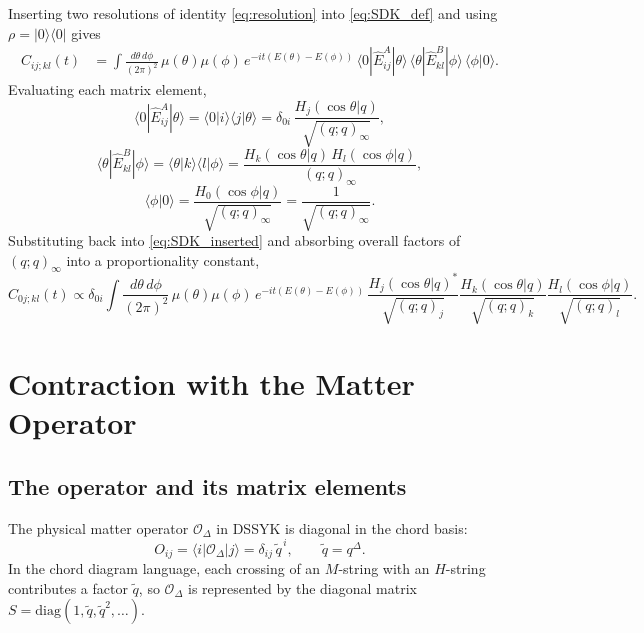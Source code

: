\documentclass[12pt]{article}
\begin{document}
Inserting two resolutions of identity \eqref{eq:resolution} into \eqref{eq:SDK_def}
and using $\rho = |0\rangle\langle 0|$ gives
\begin{align}
    C_{ij;kl}(t)
    &= \int\frac{d\theta\,d\phi}{(2\pi)^2}\,\mu(\theta)\mu(\phi)\,
       e^{-it(E(\theta)-E(\phi))}\,
       \langle 0|\hat{E}^A_{ij}|\theta\rangle\,
       \langle\theta|\hat{E}^B_{kl}|\phi\rangle\,
       \langle\phi|0\rangle.
    \label{eq:SDK_inserted}
\end{align}
Evaluating each matrix element,
\begin{equation}
    \langle 0|\hat{E}^A_{ij}|\theta\rangle
    = \langle 0|i\rangle\langle j|\theta\rangle
    = \delta_{0i}\,\frac{H_j(\cos\theta| q)}{\sqrt{(q;q)_\infty}},
\end{equation}
\begin{equation}
    \langle\theta|\hat{E}^B_{kl}|\phi\rangle
    = \langle\theta|k\rangle\langle l|\phi\rangle
    = \frac{H_k(\cos\theta| q)\,H_l(\cos\phi| q)}{(q;q)_\infty},
\end{equation}
\begin{equation}
    \langle\phi|0\rangle = \frac{H_0(\cos\phi| q)}{\sqrt{(q;q)_\infty}} = \frac{1}{\sqrt{(q;q)_\infty}}.
\end{equation}
Substituting back into \eqref{eq:SDK_inserted} and absorbing overall factors of $(q;q)_\infty$
into a proportionality constant,
\begin{equation}
    \boxed{
    C_{0j;kl}(t) \propto \delta_{0i}
    \int\frac{d\theta\,d\phi}{(2\pi)^2}\,\mu(\theta)\mu(\phi)\,
    e^{-it(E(\theta)-E(\phi))}\,
    \frac{H_j(\cos\theta| q)^*}{\sqrt{(q;q)_j}}
    \frac{H_k(\cos\theta| q)}{\sqrt{(q;q)_k}}
    \frac{H_l(\cos\phi| q)}{\sqrt{(q;q)_l}}.
    }
    \label{eq:SDK_result}
\end{equation}


\section{Contraction with the Matter Operator}

\subsection{The operator and its matrix elements}

The physical matter operator $\mathcal{O}_\Delta$ in DSSYK is diagonal in the chord basis:
\begin{equation}
    O_{ij} = \langle i|\mathcal{O}_\Delta|j\rangle = \delta_{ij}\,\tilde{q}^{\,i},
    \qquad \tilde{q} = q^\Delta.
    \label{eq:operator}
\end{equation}
In the chord diagram language, each crossing of an $M$-string with an $H$-string
contributes a factor $\tilde{q}$, so $\mathcal{O}_\Delta$ is represented by the
diagonal matrix $S = \mathrm{diag}(1,\tilde{q},\tilde{q}^2,\ldots)$.
\end{document}
